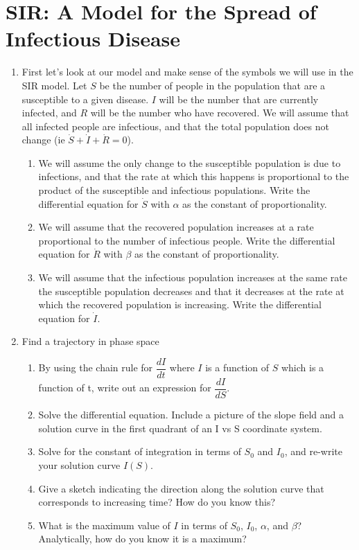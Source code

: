 \documentclass{amsbook}
\begin{document}
    \section*{SIR: A Model for the Spread of Infectious Disease}
\begin{enumerate}
	
	\item First let's look at our model and make sense of the symbols we will use in the SIR model. Let $S$ be the number of people in the population that are a susceptible to a given disease. $I$ will be the number that are currently infected, and $R$ will be the number who have recovered. We will assume that all infected people are infectious, and that the total population does not change (ie $\dot{S}+\dot{I}+\dot{R}=0$).
		\begin{enumerate}
			\item We will assume the only change to the susceptible population is due to infections, and that the rate at which this happens is proportional to the product of the susceptible and infectious populations. Write the differential equation for $\dot{S}$ with $\alpha$ as the constant of proportionality.
			\item We will assume that the recovered population increases at a rate proportional to the number of infectious people. Write the differential equation for $\dot{R}$ with $\beta$ as the constant of proportionality.
			\item We will assume that the infectious population increases at the same rate the susceptible population decreases and that it decreases at the rate at which the recovered population is increasing. Write the differential equation for $\dot{I}$.
		\end{enumerate}	
	\item Find a trajectory in phase space
	\begin{enumerate}
		\item By using the chain rule for $\dfrac{dI}{dt}$ where $I$ is a function of $S$ which is a function of t, write out an expression for $\dfrac{dI}{dS}$.
		\item Solve the differential equation. Include a picture of the slope field and a solution curve in the first quadrant of an I vs S coordinate system.
		\item Solve for the constant of integration in terms of $S_0$ and $I_0$, and re-write your solution curve $I(S)$.
		\item Give a sketch indicating the direction along the solution curve that corresponds to increasing time? How do you know this?
		\item What is the maximum value of $I$ in terms of $S_0$, $I_0$, $\alpha$, and $\beta$? Analytically, how do you know it is a maximum?
		

\end{enumerate}
\end{enumerate}
\end{document}
